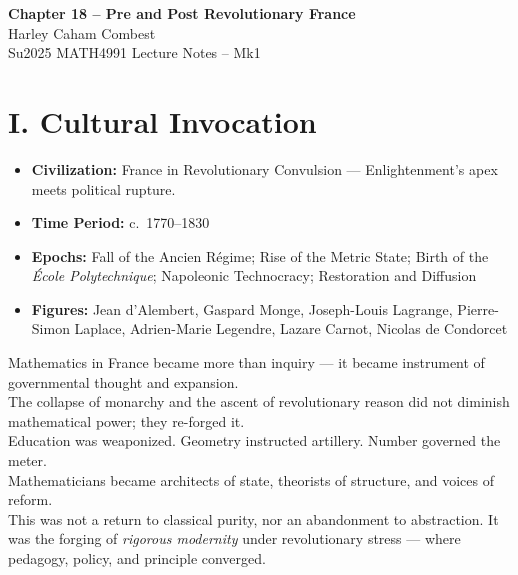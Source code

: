 \documentclass[9pt]{article}
\begin{document}
\begin{center}
\Large\textbf{Chapter 18 – Pre and Post Revolutionary France} \\
\large Harley Caham Combest \\
\large Su2025 MATH4991 Lecture Notes – Mk1
\end{center}

\vspace{1em}

\section*{I. Cultural Invocation}

\begin{itemize}
  \item \textbf{Civilization:} France in Revolutionary Convulsion --- Enlightenment’s apex meets political rupture.
  \item \textbf{Time Period:} c.\ 1770--1830
  \item \textbf{Epochs:} Fall of the Ancien Régime; Rise of the Metric State; Birth of the \textit{École Polytechnique}; Napoleonic Technocracy; Restoration and Diffusion
  \item \textbf{Figures:} Jean d’Alembert, Gaspard Monge, Joseph-Louis Lagrange, Pierre-Simon Laplace, Adrien-Marie Legendre, Lazare Carnot, Nicolas de Condorcet
\end{itemize}

\noindent
Mathematics in France became more than inquiry --- it became instrument of governmental thought and expansion.\\

\noindent
The collapse of monarchy and the ascent of revolutionary reason did not diminish mathematical power; they re-forged it. \\

\noindent
Education was weaponized. Geometry instructed artillery. Number governed the meter. \\

\noindent
Mathematicians became architects of state, theorists of structure, and voices of reform.\\

\noindent
This was not a return to classical purity, nor an abandonment to abstraction. It was the forging of \textit{rigorous modernity} under revolutionary stress --- where pedagogy, policy, and principle converged.\\


\vspace{1em}
\end{document}
